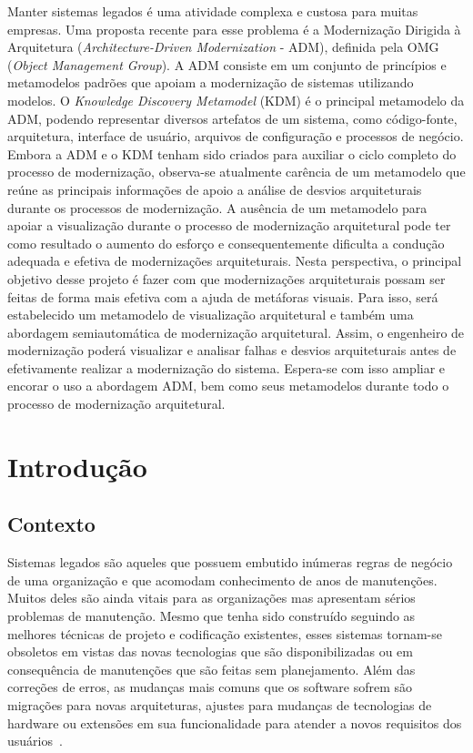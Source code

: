 \documentclass[12pt]{article}
\begin{document}
 

\setlength{\voffset}{0cm}
\setlength{\hoffset}{0cm}



\begin{resumo}
Manter sistemas legados é uma atividade complexa e custosa para muitas empresas. Uma proposta recente para esse problema é a Modernização Dirigida à Arquitetura (\textit{Architecture-Driven Modernization} - ADM), definida pela OMG (\textit{Object Management Group}). A ADM consiste em um conjunto de princípios e metamodelos padrões que apoiam a modernização de sistemas utilizando modelos. O \textit{Knowledge Discovery Metamodel} (KDM) é o principal metamodelo da ADM, podendo representar diversos artefatos de um sistema, como código-fonte, arquitetura, interface de usuário, arquivos de configuração e processos de negócio. Embora a ADM e o KDM tenham sido criados para auxiliar o ciclo completo do processo de modernização, observa-se atualmente carência de um metamodelo que reúne as principais informações de apoio a análise de desvios arquiteturais durante os processos de modernização. A ausência de um metamodelo para apoiar a visualização durante o processo de modernização arquitetural pode ter como resultado o aumento do esforço e consequentemente dificulta a condução adequada e efetiva de modernizações arquiteturais. Nesta perspectiva, o principal objetivo desse projeto é fazer com que modernizações arquiteturais possam ser feitas de forma mais efetiva com a ajuda de metáforas visuais. Para isso, será estabelecido um metamodelo de visualização arquitetural e também uma abordagem semiautomática  de modernização arquitetural. Assim, o engenheiro de modernização poderá visualizar e analisar falhas e desvios arquiteturais antes de efetivamente realizar a modernização do sistema. Espera-se com isso ampliar e encorar o uso a abordagem ADM, bem como seus metamodelos durante todo o processo de modernização arquitetural.
\end{resumo}

\section{Introdução}

\subsection{Contexto}

Sistemas legados são aqueles que possuem embutido inúmeras regras de negócio de uma organização e que acomodam conhecimento de anos de manutenções. Muitos deles são ainda vitais para as organizações mas apresentam sérios problemas de manutenção. Mesmo que tenha sido construído seguindo as melhores técnicas de projeto e codificação existentes, esses sistemas tornam-se obsoletos em vistas das novas tecnologias que são disponibilizadas ou em consequência de manutenções que são feitas sem planejamento. Além das correções de erros, as mudanças mais comuns que os software sofrem são migrações para novas arquiteturas, ajustes para mudanças de tecnologias de hardware ou extensões em sua funcionalidade para atender a novos requisitos dos usuários~\cite{Krueger92, SoftwareReuse}.
\end{document}
